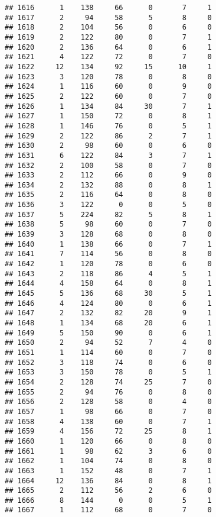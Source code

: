 \documentclass[
]{article}
\begin{document}
\begin{verbatim}
## 1616      1    138     66      0       7     1
## 1617      2     94     58      5       8     0
## 1618      2    104     56      0       6     0
## 1619      2    122     80      0       7     1
## 1620      2    136     64      0       6     1
## 1621      4    122     72      0       7     0
## 1622     12    134     92     15      10     1
## 1623      3    120     78      0       8     0
## 1624      1    116     60      0       9     0
## 1625      2    122     60      0       7     0
## 1626      1    134     84     30       7     1
## 1627      1    150     72      0       8     1
## 1628      1    146     76      0       5     1
## 1629      2    122     86      2       7     1
## 1630      2     98     60      0       6     0
## 1631      6    122     84      3       7     1
## 1632      2    100     58      0       7     0
## 1633      2    112     66      0       9     0
## 1634      2    132     88      0       8     1
## 1635      2    116     64      0       8     0
## 1636      3    122      0      0       5     0
## 1637      5    224     82      5       8     1
## 1638      5     98     60      0       7     0
## 1639      3    128     68      0       8     0
## 1640      1    138     66      0       7     1
## 1641      7    114     56      0       8     0
## 1642      1    120     78      0       6     0
## 1643      2    118     86      4       5     1
## 1644      4    158     64      0       8     1
## 1645      5    136     68     30       5     1
## 1646      4    124     80      0       6     1
## 1647      2    132     82     20       9     1
## 1648      1    134     68     20       6     1
## 1649      5    150     90      0       6     1
## 1650      2     94     52      7       4     0
## 1651      1    114     60      0       7     0
## 1652      3    118     74      0       6     0
## 1653      3    150     78      0       5     1
## 1654      2    128     74     25       7     0
## 1655      2     94     76      0       8     0
## 1656      2    128     58      0       4     0
## 1657      1     98     66      0       7     0
## 1658      4    138     60      0       7     1
## 1659      4    156     72     25       8     1
## 1660      1    120     66      0       8     0
## 1661      1     98     62      3       6     0
## 1662      1    104     74      0       8     0
## 1663      1    152     48      0       7     1
## 1664     12    136     84      0       8     1
## 1665      2    112     56      2       6     0
## 1666      8    144      0      0       5     1
## 1667      1    112     68      0       7     0

\end{verbatim}
\end{document}
